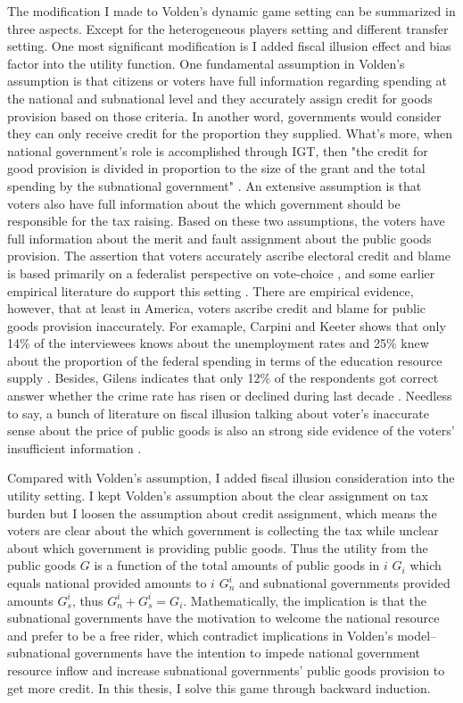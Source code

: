 \begin{itemize}
The modification I made to Volden's dynamic game setting can be summarized in three aspects. Except for the heterogeneous players setting and different transfer setting. One most significant modification is I added fiscal illusion effect and bias factor into the utility function. One fundamental assumption in Volden's assumption is that citizens or voters have full information regarding spending at the national and subnational level and they accurately assign credit for goods provision based on those criteria. In another word, governments would consider they can only receive credit for the proportion they supplied. What's more, when national government's role is accomplished through IGT, then "the credit for good provision is divided in proportion to the size of the grant and the total spending by the subnational government" \cite{volden2005intergovernmental}. An extensive assumption is that voters also have full information about the which government should be responsible for the tax raising. Based on these two assumptions, the voters have full information about the merit and fault assignment about the public goods provision. The assertion that voters accurately ascribe electoral credit and blame is based primarily on a federalist perspective on vote-choice \cite{stein1990economic}, and some earlier empirical literature do support this setting \cite{atkeson1995economic}. There are empirical evidence, however, that at least in America, voters ascribe credit and blame for public goods provision inaccurately. For examaple, Carpini and Keeter shows that only 14\% of the interviewees knows about the unemployment rates and 25\% knew about the proportion of the federal spending in terms of the education resource supply \cite{carpini1996americans}. Besides, Gilens indicates that only 12\% of the respondents got correct answer whether the crime rate has risen or declined during last decade \cite{gilens2001political}. Needless to say, a bunch of literature on fiscal illusion talking about voter's inaccurate sense about the price of public goods is also an strong side evidence of the voters' insufficient information \cite{oates1979lump,borge1995lump,turnbull1998overspending}.

Compared with Volden's assumption, I added fiscal illusion consideration into the utility setting. I kept Volden's assumption about the clear assignment on tax burden but I loosen the assumption about credit assignment, which means the voters are clear about the which government is collecting the tax while unclear about which government is providing public goods. Thus the utility from the public goods $G$ is a function of the total amounts of public goods in $i$ $G_i$ which equals national provided amounts to $i$ $G_n^i$ and subnational governments provided amounts $G_s^i$, thus $G_n^i+G_s^i=G_i$. Mathematically, the implication is that the subnational governments have the motivation to welcome the national resource and prefer to be a free rider, which contradict implications in Volden's model--subnational governments have the intention to impede national government resource inflow and increase subnational governments' public goods provision to get more credit. In this thesis, I solve this game through backward induction.


\end{itemize}
